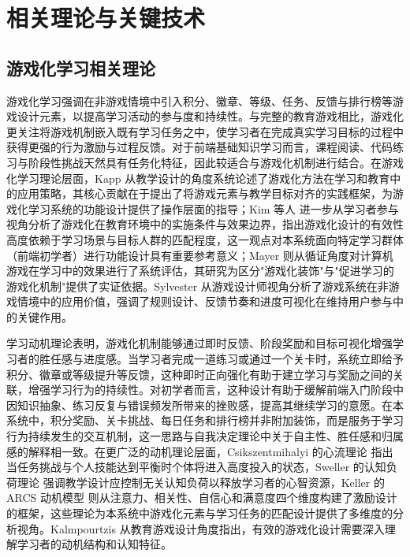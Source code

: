 
\chapter{相关理论与关键技术}

\section{游戏化学习相关理论}

游戏化学习强调在非游戏情境中引入积分、徽章、等级、任务、反馈与排行榜等游戏设计元素，以提高学习活动的参与度和持续性。与完整的教育游戏相比，游戏化更关注将游戏机制嵌入既有学习任务之中，使学习者在完成真实学习目标的过程中获得更强的行为激励与过程反馈。对于前端基础知识学习而言，课程阅读、代码练习与阶段性挑战天然具有任务化特征，因此较适合与游戏化机制进行结合。在游戏化学习理论层面，Kapp\cite{kapp2012} 从教学设计的角度系统论述了游戏化方法在学习和教育中的应用策略，其核心贡献在于提出了将游戏元素与教学目标对齐的实践框架，为游戏化学习系统的功能设计提供了操作层面的指导；Kim 等人\cite{kim2018} 进一步从学习者参与视角分析了游戏化在教育环境中的实施条件与效果边界，指出游戏化设计的有效性高度依赖于学习场景与目标人群的匹配程度，这一观点对本系统面向特定学习群体（前端初学者）进行功能设计具有重要参考意义；Mayer\cite{mayer2014} 则从循证角度对计算机游戏在学习中的效果进行了系统评估，其研究为区分"游戏化装饰"与"促进学习的游戏化机制"提供了实证依据。Sylvester\cite{sylvester2013} 从游戏设计师视角分析了游戏系统在非游戏情境中的应用价值，强调了规则设计、反馈节奏和进度可视化在维持用户参与中的关键作用。

学习动机理论表明，游戏化机制能够通过即时反馈、阶段奖励和目标可视化增强学习者的胜任感与进度感。当学习者完成一道练习或通过一个关卡时，系统立即给予积分、徽章或等级提升等反馈，这种即时正向强化有助于建立学习与奖励之间的关联，增强学习行为的持续性。对初学者而言，这种设计有助于缓解前端入门阶段中因知识抽象、练习反复与错误频发所带来的挫败感，提高其继续学习的意愿。在本系统中，积分奖励、关卡挑战、每日任务和排行榜并非附加装饰，而是服务于学习行为持续发生的交互机制，这一思路与自我决定理论中关于自主性、胜任感和归属感的解释相一致。在更广泛的动机理论层面，Csikszentmihalyi 的心流理论\cite{csikszentmihalyi2008} 指出当任务挑战与个人技能达到平衡时个体将进入高度投入的状态，Sweller 的认知负荷理论\cite{sweller1988,sweller2010} 强调教学设计应控制无关认知负荷以释放学习者的心智资源，Keller 的 ARCS 动机模型\cite{keller1987} 则从注意力、相关性、自信心和满意度四个维度构建了激励设计的框架，这些理论为本系统中游戏化元素与学习任务的匹配设计提供了多维度的分析视角。Kalmpourtzis\cite{kalmpourtzis2018} 从教育游戏设计角度指出，有效的游戏化设计需要深入理解学习者的动机结构和认知特征。

